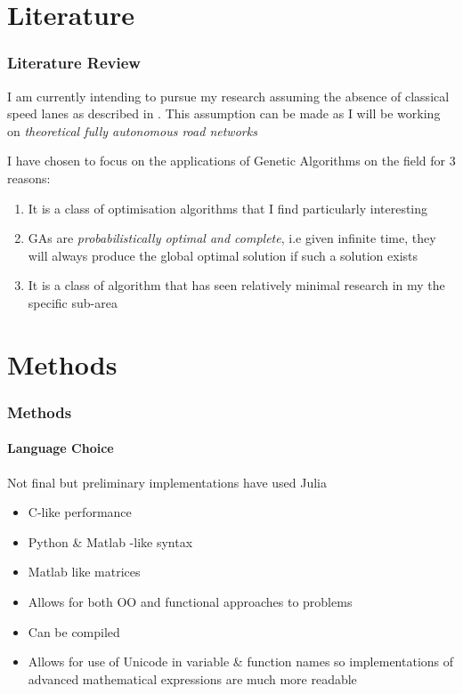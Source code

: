 \documentclass{beamer}
\begin{document}
\section{Literature}
\begin{frame}
    \frametitle{Literature Review}
    I am currently intending to pursue my research assuming the absence of classical speed lanes as described in \cite{kalaMotionPlanningAutonomous2013}. This assumption can be made as I will be working on \textit{theoretical fully autonomous road networks}

    I have chosen to focus on the applications of Genetic Algorithms on the field for 3 reasons: 
    \begin{enumerate}
        \item It is a class of optimisation algorithms that I find particularly interesting
        \item GAs are \textit{probabilistically optimal and complete}, i.e given infinite time, they will always produce the global optimal solution if such a solution exists
        \item It is a class of algorithm that has seen relatively minimal research in my the specific sub-area 

    \end{enumerate}
\end{frame}


\section{Methods}
\begin{frame}
    \frametitle{Methods}
    \framesubtitle{Language Choice} 
    Not final but preliminary implementations have used Julia\cite{JuliaProgrammingLanguage}
    \begin{itemize}
        \item C-like performance
        \item Python \& Matlab -like syntax
        \item Matlab like matrices 
        \item Allows for both OO and functional approaches to problems
        \item Can be compiled
        \item Allows for use of Unicode in variable \& function names so implementations of advanced mathematical expressions are much more readable
    \end{itemize}
\end{frame}
\end{document}

